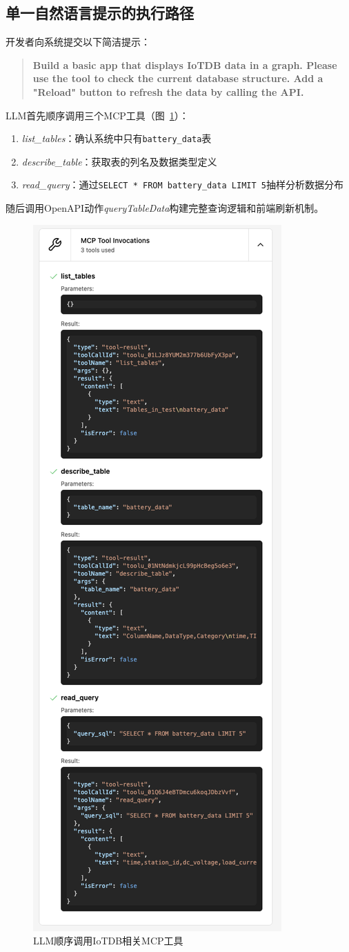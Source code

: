 \subsection{单一自然语言提示的执行路径}

开发者向系统提交以下简洁提示：

\begin{quote}
\small
\textbf{Build a basic app that displays IoTDB data in a graph. Please use the tool to check the current database structure. Add a "Reload" button to refresh the data by calling the API.}
\end{quote}

LLM首先顺序调用三个MCP工具（图~\ref{fig:mcp-call}）：
\begin{enumerate}
  \item \textit{list\_tables}：确认系统中只有\texttt{battery\_data}表
  \item \textit{describe\_table}：获取表的列名及数据类型定义
  \item \textit{read\_query}：通过\verb|SELECT * FROM battery_data LIMIT 5|抽样分析数据分布
\end{enumerate}

随后调用OpenAPI动作\textit{queryTableData}构建完整查询逻辑和前端刷新机制。

\begin{figure}[htbp]
  \centering
  \includegraphics[width=.5\textwidth]{figures/screenshots/iotdb-demo/mcp-call.png}
  \caption{LLM顺序调用IoTDB相关MCP工具}
  \label{fig:mcp-call}
\end{figure}

